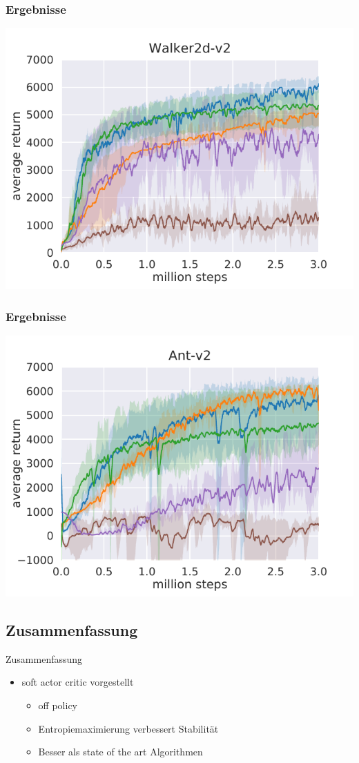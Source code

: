 \begin{frame}
    \frametitle{Ergebnisse}
    \includegraphics[scale=0.8]{figures/walker.pdf}
\end{frame}

\begin{frame}
    \frametitle{Ergebnisse}
    \includegraphics[scale=0.8]{figures/ant.pdf}
\end{frame}

\subsection{Zusammenfassung}
\begin{frame}{Zusammenfassung}
        \begin{itemize}
            \item soft actor critic vorgestellt
            \begin{itemize}
                \item off policy
                \item Entropiemaximierung verbessert Stabilität
                \item Besser als state of the art Algorithmen 
            \end{itemize} 
        \end{itemize}
\end{frame}

